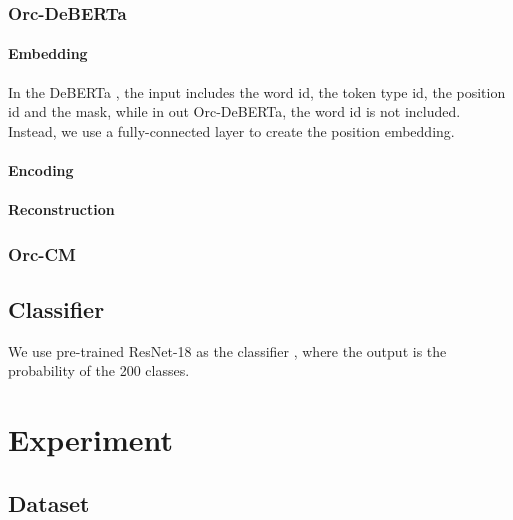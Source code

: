 \documentclass{article}
\begin{document}

\subsubsection{Orc-DeBERTa}


\paragraph{Embedding}
In the DeBERTa \citep{Package}, the input includes the word id,  the token type id, the position id and the mask, while in out Orc-DeBERTa, the word id is not included. Instead, we use a fully-connected layer to create the position embedding.

\paragraph{Encoding}

\paragraph{Reconstruction}

\subsubsection{Orc-CM}

\subsection{Classifier}

We use pre-trained ResNet-18 as the classifier \citep{ResNet}, where the output is the probability of the 200 classes.

\section{Experiment}

\subsection{Dataset}
\end{document}
